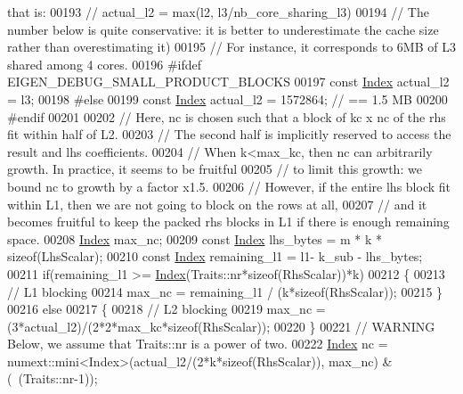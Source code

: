 \begin{DoxyCode}
{       that is:}
00193     \textcolor{comment}{//      actual\_l2 = max(l2, l3/nb\_core\_sharing\_l3)}
00194     \textcolor{comment}{// The number below is quite conservative: it is better to underestimate the cache size rather than
       overestimating it)}
00195     \textcolor{comment}{// For instance, it corresponds to 6MB of L3 shared among 4 cores.}
00196 \textcolor{preprocessor}{    #ifdef EIGEN\_DEBUG\_SMALL\_PRODUCT\_BLOCKS}
00197     \textcolor{keyword}{const} \hyperlink{namespace_eigen_a62e77e0933482dafde8fe197d9a2cfde}{Index} actual\_l2 = l3;
00198 \textcolor{preprocessor}{    #else}
00199     \textcolor{keyword}{const} \hyperlink{namespace_eigen_a62e77e0933482dafde8fe197d9a2cfde}{Index} actual\_l2 = 1572864; \textcolor{comment}{// == 1.5 MB}
00200 \textcolor{preprocessor}{    #endif}
00201 
00202     \textcolor{comment}{// Here, nc is chosen such that a block of kc x nc of the rhs fit within half of L2.}
00203     \textcolor{comment}{// The second half is implicitly reserved to access the result and lhs coefficients.}
00204     \textcolor{comment}{// When k<max\_kc, then nc can arbitrarily growth. In practice, it seems to be fruitful}
00205     \textcolor{comment}{// to limit this growth: we bound nc to growth by a factor x1.5.}
00206     \textcolor{comment}{// However, if the entire lhs block fit within L1, then we are not going to block on the rows at all,}
00207     \textcolor{comment}{// and it becomes fruitful to keep the packed rhs blocks in L1 if there is enough remaining space.}
00208     \hyperlink{namespace_eigen_a62e77e0933482dafde8fe197d9a2cfde}{Index} max\_nc;
00209     \textcolor{keyword}{const} \hyperlink{namespace_eigen_a62e77e0933482dafde8fe197d9a2cfde}{Index} lhs\_bytes = m * k * \textcolor{keyword}{sizeof}(LhsScalar);
00210     \textcolor{keyword}{const} \hyperlink{namespace_eigen_a62e77e0933482dafde8fe197d9a2cfde}{Index} remaining\_l1 = l1- k\_sub - lhs\_bytes;
00211     \textcolor{keywordflow}{if}(remaining\_l1 >= \hyperlink{namespace_eigen_a62e77e0933482dafde8fe197d9a2cfde}{Index}(Traits::nr*\textcolor{keyword}{sizeof}(RhsScalar))*k)
00212     \{
00213       \textcolor{comment}{// L1 blocking}
00214       max\_nc = remaining\_l1 / (k*\textcolor{keyword}{sizeof}(RhsScalar));
00215     \}
00216     \textcolor{keywordflow}{else}
00217     \{
00218       \textcolor{comment}{// L2 blocking}
00219       max\_nc = (3*actual\_l2)/(2*2*max\_kc*\textcolor{keyword}{sizeof}(RhsScalar));
00220     \}
00221     \textcolor{comment}{// WARNING Below, we assume that Traits::nr is a power of two.}
00222     \hyperlink{namespace_eigen_a62e77e0933482dafde8fe197d9a2cfde}{Index} nc = numext::mini<Index>(actual\_l2/(2*k*\textcolor{keyword}{sizeof}(RhsScalar)), max\_nc) & (~(Traits::nr-1));

\end{DoxyCode}
